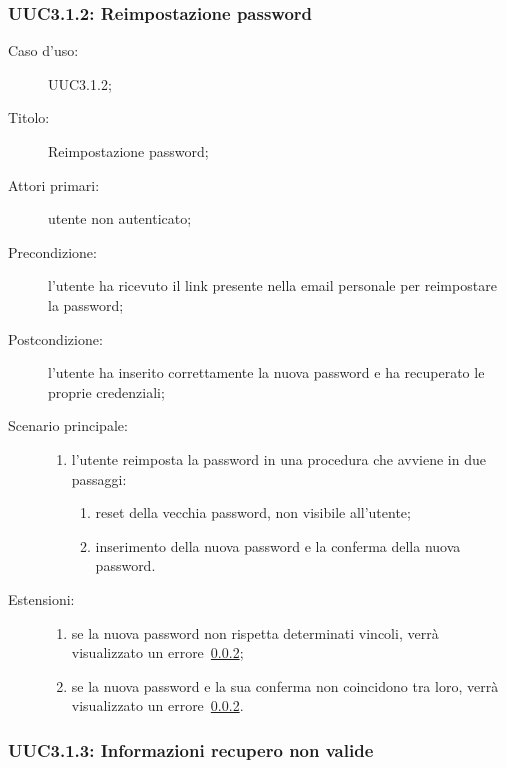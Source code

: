 \documentclass[../../../analisi-dei-requisiti.tex]{subfiles}
\begin{document}
\subsubsection{UUC3.1.2: Reimpostazione password}%
\label{subs:UUC3.1.2}
\begin{description}
  \item[Caso d’uso:] UUC3.1.2;
  \item[Titolo:] Reimpostazione password;
  \item[Attori primari:] utente non autenticato;
  \item[Precondizione:] l'utente ha ricevuto il link presente nella email personale per reimpostare la password;
  \item[Postcondizione:] l'utente ha inserito correttamente la nuova password e ha recuperato le proprie credenziali;
  \item[Scenario principale:]
        \begin{enumerate}
          \item l'utente reimposta la password in una procedura che avviene in due passaggi:
                \begin{enumerate}
                  \item reset della vecchia password, non visibile all'utente;
                  \item inserimento della nuova password e la conferma della nuova password.
                \end{enumerate}
        \end{enumerate}
  \item[Estensioni:]
        \begin{enumerate}
          \item se la nuova password non rispetta determinati vincoli, verrà visualizzato un errore~\ref{subs:UUC3.1.3};
          \item se la nuova password e la sua conferma non coincidono tra loro, verrà visualizzato un errore~\ref{subs:UUC3.1.3}.
        \end{enumerate}
\end{description}

\subsubsection{UUC3.1.3: Informazioni recupero non valide}%
\label{subs:UUC3.1.3}
\end{document}
